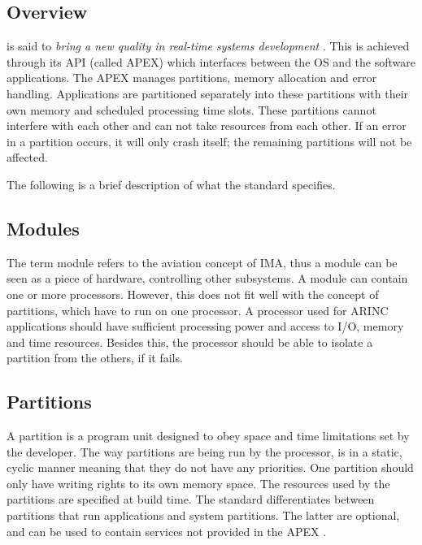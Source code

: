 \subsection{Overview}


\arinc{} is said to \textit{bring a new quality in real-time systems development} \cite{arinc_scarlett}.
This is achieved through its API (called APEX) which interfaces between the OS and the software applications.
The APEX manages partitions, memory allocation and error handling.
Applications are partitioned separately into these partitions with their own memory and scheduled processing time slots.
These partitions cannot interfere with each other and can not take resources from each other.
If an error in a partition occurs, it will only crash itself; the remaining partitions will not be affected.

The following is a brief description of what the standard specifies.

\subsection{Modules}
The term module refers to the aviation concept of IMA, thus a module
can be seen as a piece of hardware, controlling other subsystems.
A module can contain one or more processors. However, this does not fit 
well with the concept of partitions,
which have to run on one processor. \cite{page_11}
A processor used for ARINC applications should have sufficient processing
power and access to I/O, memory and time resources. Besides
this, the processor should be able to isolate a partition from
the others, if it fails.
\cite{page_12}

\subsection{Partitions}
A partition is a program unit designed to obey space and time limitations
set by the developer. The way partitions are being run by the processor,
is in a static, cyclic manner meaning that they do not have any priorities.
One partition should only have writing rights to its own memory space. 
\cite{page_13}
The resources used by the partitions are specified at build time.
\cite{page_14}
The standard differentiates between partitions that run applications and system partitions. The latter are optional, and can be used to contain
services not provided in the APEX \cite{scarlett_page_3}.

